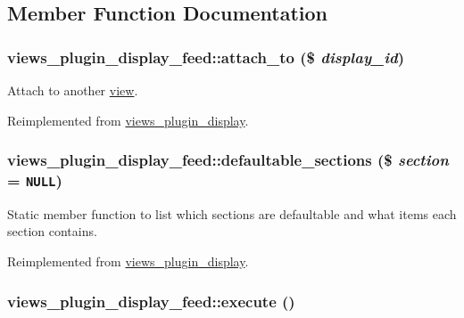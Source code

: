 \subsection{Member Function Documentation}
\hypertarget{classviews__plugin__display__feed_ea8b688de38f11854afdb4194e87f59d}{
\subsubsection[{attach\_\-to}]{\setlength{\rightskip}{0pt plus 5cm}views\_\-plugin\_\-display\_\-feed::attach\_\-to (\$ {\em display\_\-id})}}
\label{classviews__plugin__display__feed_ea8b688de38f11854afdb4194e87f59d}


Attach to another \hyperlink{classview}{view}. 

Reimplemented from \hyperlink{classviews__plugin__display_a74683048bca4e740cb7e25ae4c527d4}{views\_\-plugin\_\-display}.\hypertarget{classviews__plugin__display__feed_adbff7e4fb0bc05dfee8bc38ea1349dc}{
\subsubsection[{defaultable\_\-sections}]{\setlength{\rightskip}{0pt plus 5cm}views\_\-plugin\_\-display\_\-feed::defaultable\_\-sections (\$ {\em section} = {\tt NULL})}}
\label{classviews__plugin__display__feed_adbff7e4fb0bc05dfee8bc38ea1349dc}


Static member function to list which sections are defaultable and what items each section contains. 

Reimplemented from \hyperlink{classviews__plugin__display_1ff9cd1b5762dde8765e608efdec8ec4}{views\_\-plugin\_\-display}.\hypertarget{classviews__plugin__display__feed_6bfa566313f3f8fba85751554567e2dd}{
\subsubsection[{execute}]{\setlength{\rightskip}{0pt plus 5cm}views\_\-plugin\_\-display\_\-feed::execute ()}}
\label{classviews__plugin__display__feed_6bfa566313f3f8fba85751554567e2dd}


